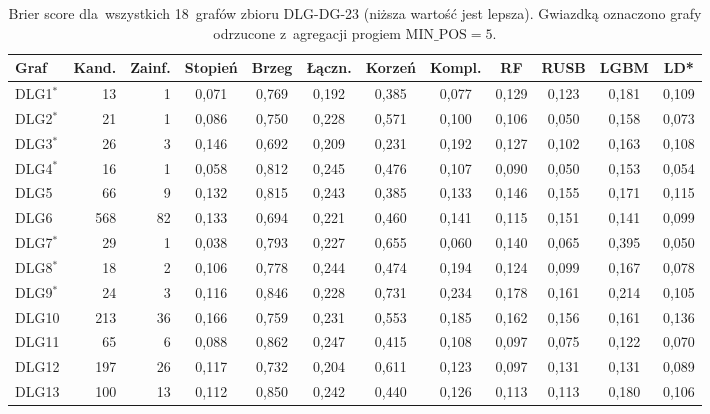 \begin{table}[ht]
\centering
\caption{Brier score dla~wszystkich 18~grafów zbioru DLG-DG-23 (niższa wartość jest lepsza). Gwiazdką oznaczono grafy odrzucone z~agregacji progiem $\mathrm{MIN\_POS} = 5$.}
\label{tab:dodb-brier}
\footnotesize
\setlength{\tabcolsep}{3.5pt}
\begin{tabular}{lrrccccccccc}
\toprule
\textbf{Graf} & \textbf{Kand.} & \textbf{Zainf.} & \textbf{Stopień} & \textbf{Brzeg} & \textbf{Łączn.} & \textbf{Korzeń} & \textbf{Kompl.} & \textbf{RF} & \textbf{RUSB} & \textbf{LGBM} & \textbf{LD*} \\
\midrule
DLG1$^{*}$ & 13 & 1 & 0{,}071 & 0{,}769 & 0{,}192 & 0{,}385 & 0{,}077 & 0{,}129 & 0{,}123 & 0{,}181 & 0{,}109 \\
DLG2$^{*}$ & 21 & 1 & 0{,}086 & 0{,}750 & 0{,}228 & 0{,}571 & 0{,}100 & 0{,}106 & 0{,}050 & 0{,}158 & 0{,}073 \\
DLG3$^{*}$ & 26 & 3 & 0{,}146 & 0{,}692 & 0{,}209 & 0{,}231 & 0{,}192 & 0{,}127 & 0{,}102 & 0{,}163 & 0{,}108 \\
DLG4$^{*}$ & 16 & 1 & 0{,}058 & 0{,}812 & 0{,}245 & 0{,}476 & 0{,}107 & 0{,}090 & 0{,}050 & 0{,}153 & 0{,}054 \\
DLG5 & 66 & 9 & 0{,}132 & 0{,}815 & 0{,}243 & 0{,}385 & 0{,}133 & 0{,}146 & 0{,}155 & 0{,}171 & 0{,}115 \\
DLG6 & 568 & 82 & 0{,}133 & 0{,}694 & 0{,}221 & 0{,}460 & 0{,}141 & 0{,}115 & 0{,}151 & 0{,}141 & 0{,}099 \\
DLG7$^{*}$ & 29 & 1 & 0{,}038 & 0{,}793 & 0{,}227 & 0{,}655 & 0{,}060 & 0{,}140 & 0{,}065 & 0{,}395 & 0{,}050 \\
DLG8$^{*}$ & 18 & 2 & 0{,}106 & 0{,}778 & 0{,}244 & 0{,}474 & 0{,}194 & 0{,}124 & 0{,}099 & 0{,}167 & 0{,}078 \\
DLG9$^{*}$ & 24 & 3 & 0{,}116 & 0{,}846 & 0{,}228 & 0{,}731 & 0{,}234 & 0{,}178 & 0{,}161 & 0{,}214 & 0{,}105 \\
DLG10 & 213 & 36 & 0{,}166 & 0{,}759 & 0{,}231 & 0{,}553 & 0{,}185 & 0{,}162 & 0{,}156 & 0{,}161 & 0{,}136 \\
DLG11 & 65 & 6 & 0{,}088 & 0{,}862 & 0{,}247 & 0{,}415 & 0{,}108 & 0{,}097 & 0{,}075 & 0{,}122 & 0{,}070 \\
DLG12 & 197 & 26 & 0{,}117 & 0{,}732 & 0{,}204 & 0{,}611 & 0{,}123 & 0{,}097 & 0{,}131 & 0{,}131 & 0{,}089 \\
DLG13 & 100 & 13 & 0{,}112 & 0{,}850 & 0{,}242 & 0{,}440 & 0{,}126 & 0{,}113 & 0{,}113 & 0{,}180 & 0{,}106 \\

\end{tabular}
\end{table}
